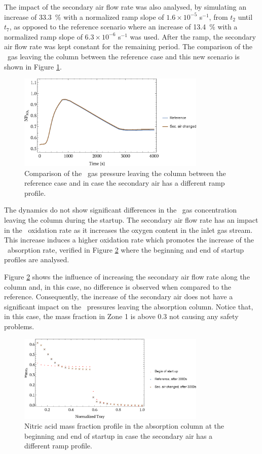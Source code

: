 \documentclass[journal=jacsat,manuscript=article]{achemso}
\newcommand{\nox}{\ce{NO_{\rmfamily{x}}}}
\newcommand{\no}{\ce{NO}}
\begin{document}
The impact of the secondary air flow rate was also analysed, by simulating an increase of \SI{33.3}{\percent} with a normalized ramp slope of $1.6 \times 10^{-5}$ s$^{-1}$, from $t_2$ until $t_7$, as opposed to the reference scenario where an increase of \SI{13.4}{\percent} with a normalized ramp slope of $6.3 \times 10^{-6}$ s$^{-1}$ was used.
After the ramp, the secondary air flow rate was kept constant for the remaining period.
The comparison of the \nox~gas leaving the column between the reference case and this new scenario is shown in Figure \ref{fig:startair}.
\begin{figure}[htb]
	\centering
	\includegraphics[width=0.8\textwidth]{figure5sp.eps}
	\caption{Comparison of the \nox~gas pressure leaving the column between the reference case and in case the secondary air has a different ramp profile.} 	
	\label{fig:startair}
\end{figure}
The dynamics do not show significant differences in the \nox~gas concentration leaving the column during the startup. 
The secondary air flow rate has an impact in the \no~oxidation rate as it increases the oxygen content in the inlet gas stream. This increase induces a higher oxidation rate which promotes the increase of the \nox~absorption rate, verified in Figure \ref{fig:startairperfil} where the beginning and end of startup profiles are analysed.

Figure \ref{fig:startairperfil} shows the influence of increasing the secondary air flow rate along the column and, in this case, no difference is observed when compared to the reference. Consequently, the increase of the secondary air does not have a significant impact on the \nox~pressures leaving the absorption column. Notice that, in this case, the mass fraction in Zone 1 is above 0.3 not causing any safety problems.

\begin{figure}[htb]
	\centering
	\includegraphics[width=0.8\textwidth]{figure6sp.eps}
	\caption{Nitric acid mass fraction profile in the absorption column at the beginning and end of startup in case the secondary air has a different ramp profile.} 	
	\label{fig:startairperfil}
\end{figure}
\end{document}
